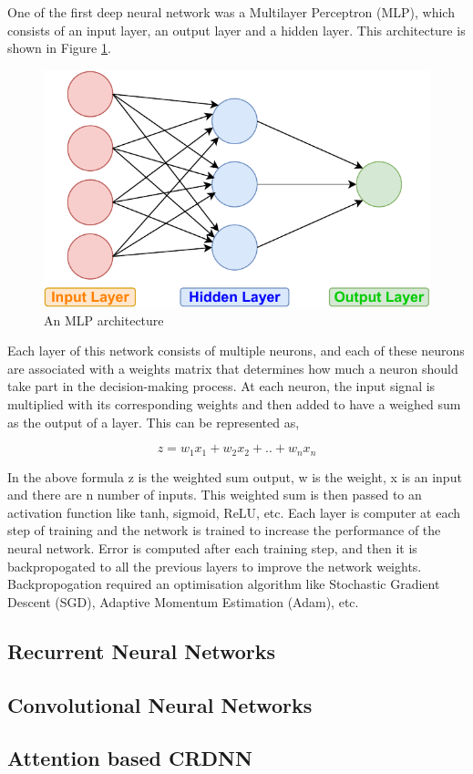 One of the first deep neural network was a Multilayer Perceptron (MLP), which consists of an input layer, an output layer and a hidden layer. This architecture is shown in Figure \ref{fig:mlp}. 

\begin{figure}[ht]
  \begin{center}
    \includegraphics[width=\textwidth]{images/MLP.pdf} 
    \caption{An MLP architecture}
    \label{fig:mlp}
  \end{center}
\end{figure}

Each layer of this network consists of multiple neurons, and each of these neurons are associated with a weights matrix that determines how much a neuron should take part in the decision-making process. At each neuron, the input signal is multiplied with its corresponding weights and then added to have a weighed sum as the output of a layer. This can be represented as,

\[ z = w_1x_1 + w_2x_2 + .. + w_nx_n \]

In the above formula z is the weighted sum output, w is the weight, x is an input and there are n number of inputs. This weighted sum is then passed to an activation function like tanh, sigmoid, ReLU, etc. Each layer is computer at each step of training and the network is trained to increase the performance of the neural network. Error is computed after each training step, and then it is backpropogated to all the previous layers to improve the network weights. Backpropogation required an optimisation algorithm like Stochastic Gradient Descent (SGD), Adaptive Momentum Estimation (Adam), etc.

\subsection {Recurrent Neural Networks}
\subsection {Convolutional Neural Networks}
\subsection {Attention based CRDNN}


